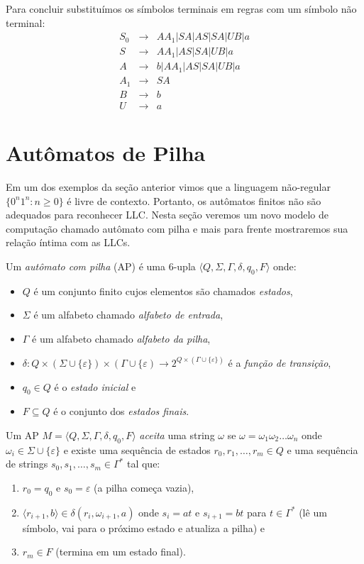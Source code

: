 \begin{example}
  Para concluir substituímos os símbolos terminais em regras com um símbolo não terminal:
  \begin{eqnarray*}
    S_0 &\to& AA_1 | SA | AS | SA | UB | a\\
    S &\to& AA_1 | AS | SA | UB | a\\
    A &\to& b | AA_1 | AS | SA | UB | a\\
    A_1 &\to& SA\\
    B &\to& b\\
    U &\to& a
  \end{eqnarray*}


\end{example}


\section{Autômatos de Pilha}
\label{sec:ap}

Em um dos exemplos da seção anterior vimos que a linguagem não-regular $\{0^n1^n : n \geq 0\}$ é livre de contexto.
Portanto, os autômatos finitos não são adequados para reconhecer LLC.
Nesta seção veremos um novo modelo de computação chamado autômato com pilha  e mais para frente mostraremos sua relação íntima com as LLCs.

Um {\em autômato com pilha} (AP) é uma 6-upla $\langle Q, \Sigma, \Gamma, \delta, q_0, F \rangle$ onde:
\begin{itemize}
\item $Q$ é um conjunto finito cujos elementos são chamados {\em estados},
\item $\Sigma$ é um alfabeto chamado {\em alfabeto de entrada},
\item $\Gamma$ é um alfabeto chamado {\em alfabeto da pilha},
\item $\delta: Q \times (\Sigma \cup \{\varepsilon\}) \times (\Gamma \cup \{\varepsilon) \to 2^{Q \times (\Gamma \cup \{\varepsilon\})}$ é a {\em função de transição},
\item $q_0 \in Q$ é o {\em estado inicial} e
\item $F \subseteq Q$ é o conjunto dos {\em estados finais}.
\end{itemize}

Um AP $M = \langle Q, \Sigma, \Gamma, \delta, q_0, F \rangle$ {\em aceita} uma string $\omega$ se $\omega = \omega_1 \omega_2 \dots \omega_n$ onde $\omega_i \in \Sigma \cup \{\varepsilon\}$ e existe uma sequência de estados $r_0, r_1, \dots, r_m \in Q$ e uma sequência de strings $s_0, s_1, \dots, s_m \in \Gamma^*$ tal que:
\begin{enumerate}
\item $r_0 = q_0$ e $s_0 = \varepsilon$ (a pilha começa vazia),
\item $\langle r_{i+1}, b \rangle \in \delta(r_i, \omega_{i+1}, a)$ onde $s_i = at$ e $s_{i+1} = bt$ para $t \in \Gamma^*$ (lê um símbolo, vai para o próximo estado e atualiza a pilha) e
\item $r_m \in F$ (termina em um estado final).
\end{enumerate}

